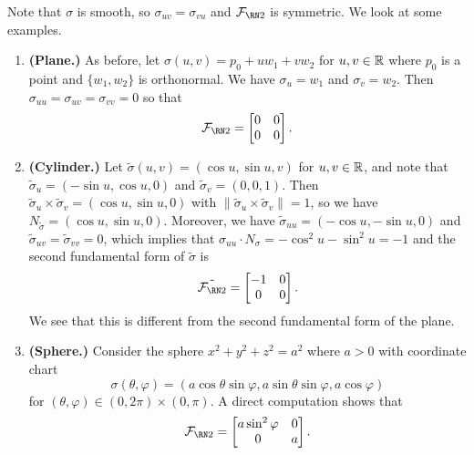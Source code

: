 Note that $\sigma$ is smooth, so $\sigma_{uv} = \sigma_{vu}$ and 
$\SFF$ is symmetric. We look at some examples. 

\begin{enumerate}[(1)]
    \item {\bf (Plane.)} As before, let $\sigma(u, v) = p_0 + uw_1 + vw_2$ 
    for $u, v \in \mathbb{R}$ where $p_0$ is a point and $\{w_1, w_2\}$ is orthonormal.
    We have $\sigma_u = w_1$ and $\sigma_v = w_2$. Then 
    $\sigma_{uu} = \sigma_{uv} = \sigma_{vv} = 0$ so that 
    \[ \SFF = \begin{bmatrix}
        0 & 0 \\ 0 & 0
    \end{bmatrix}. \] 

    \item {\bf (Cylinder.)} Let $\tilde\sigma(u, v) = (\cos u, \sin u, v)$ for 
    $u, v \in \mathbb{R}$, and note that $\tilde\sigma_u = (-\sin u, \cos u, 0)$ 
    and $\tilde\sigma_v = (0, 0, 1)$. Then $\tilde\sigma_u \times 
    \tilde\sigma_v = (\cos u, \sin u, 0)$ with $\|\tilde\sigma_u \times 
    \tilde\sigma_v\| = 1$, so we have $N_{\tilde\sigma} = (\cos u, \sin u, 0)$.
    Moreover, we have $\tilde\sigma_{uu} = (-\cos u, -\sin u, 0)$ and 
    $\tilde\sigma_{uv} = \tilde\sigma_{vv} = 0$, which implies that 
    $\sigma_{uu} \cdot N_\sigma = -\cos^2 u - \sin^2 u = -1$ and the second 
    fundamental form of $\tilde\sigma$ is 
    \[ \tilde{\SFF} = \begin{bmatrix}
        -1 & 0 \\ 0 & 0
    \end{bmatrix}. \] 
    We see that this is different from the second fundamental form of the plane.

    \item {\bf (Sphere.)} Consider the sphere $x^2 + y^2 + z^2 = a^2$ where $a > 0$ 
    with coordinate chart 
    \[ \sigma(\theta, \varphi) = (a\cos\theta\sin\varphi, a\sin\theta\sin\varphi, a\cos\varphi) \] 
    for $(\theta, \varphi) \in (0, 2\pi) \times (0, \pi)$. A direct 
    computation shows that 
    \[ \SFF = \begin{bmatrix}
        a\sin^2\varphi & 0 \\ 0 & a
    \end{bmatrix}. \] 


\end{enumerate}
